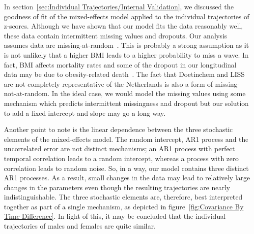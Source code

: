 \documentclass{imammb}
\numberwithin{equation}{section}
\begin{document}
In section~\ref{sec:Individual Trajectories/Internal Validation}, we discussed the goodness of fit of the mixed-effects model applied to the \mbox{individual} trajectories of z-scores. Although we have shown that our model fits the data reasonably well, these data contain intermittent missing values and dropouts. Our analysis assumes data are missing-at-random~\citep{Diggle1994, Verbeke2000}. This is probably a strong assumption as it is not unlikely that a higher BMI leads to a higher probability to miss a wave. In fact, BMI \mbox{affects} mortality rates and some of the dropout in our longitudinal data may be due to obesity-related death~\citep{Hoogenveen2000}. The fact that Doetinchem and LISS are not completely representative of the Netherlands is also a form of missing-not-at-random. In the ideal case, we would model the missing values using some mechanism which predicts intermittent missingness and dropout but our solution to add a fixed intercept and slope may go a long way.

Another point to note is the linear dependence between the three stochastic elements of the mixed-effects model. The random intercept, AR1 process and the uncorrelated error are not distinct mechanisms; an AR1 process with perfect temporal correlation leads to a random intercept, whereas a process with zero correlation leads to random noise. So, in a way, our model contains three distinct AR1 processes. As a result, small changes in the data may lead to relatively large changes in the parameters even though the resulting trajectories are nearly indistinguishable. The three stochastic elements are, therefore, best interpreted together as part of a single mechanism, as depicted in figure~\ref{fig:Covariance By Time Difference}. In light of this, it may be concluded that the individual trajectories of males and females are quite similar.
\end{document}
